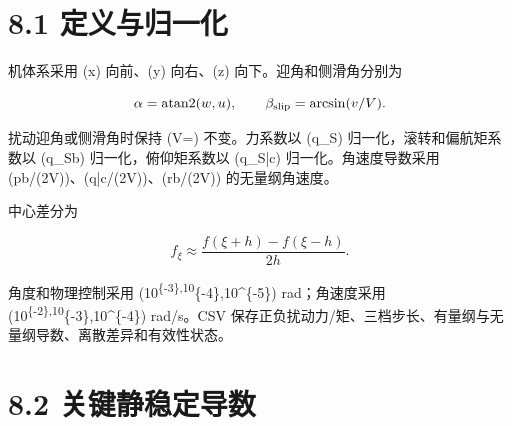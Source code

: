 \documentclass[UTF8,11pt,oneside,openany,fontset=windows]{ctexbook}
\begin{document}
\section{8.1 定义与归一化}\label{ux5b9aux4e49ux4e0eux5f52ux4e00ux5316}

机体系采用 (x) 向前、(y) 向右、(z) 向下。迎角和侧滑角分别为

\[
\alpha=\operatorname{atan2}(w,u),\qquad
\beta_{\rm slip}=\arcsin(v/V).
\]

扰动迎角或侧滑角时保持 (V=) 不变。力系数以
(q\_\infty S) 归一化，滚转和偏航矩系数以 (q\_\infty Sb)
归一化，俯仰矩系数以 (q\_\infty S\bar c) 归一化。角速度导数采用
(pb/(2V))、(q\bar c/(2V))、(rb/(2V)) 的无量纲角速度。

中心差分为

\[
f_\xi\approx\frac{f(\xi+h)-f(\xi-h)}{2h}.
\]

角度和物理控制采用 (10\textsuperscript{\{-3\},10}\{-4\},10\^{}\{-5\})
rad；角速度采用 (10\textsuperscript{\{-2\},10}\{-3\},10\^{}\{-4\})
rad/s。CSV
保存正负扰动力/矩、三档步长、有量纲与无量纲导数、离散差异和有效性状态。

\section{8.2
关键静稳定导数}\label{ux5173ux952eux9759ux7a33ux5b9aux5bfcux6570}
\end{document}
